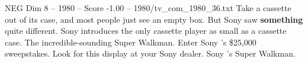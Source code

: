 \begin{textsample}{NEG Dim 8 – 1980 – Score -1.00 – 1980/tv\_com\_1980\_36.txt}  \label{ex:f8_neg_059}
Take a cassette out of its case, and most people just see an empty box.
But Sony saw \textbf{something} quite different.
Sony introduces the only cassette player as small as a cassette case.
The incredible-sounding Super Walkman.
Enter Sony 's \$25,000 sweepstakes.
Look for this display at your Sony dealer.
Sony 's Super Walkman.

\end{textsample}
